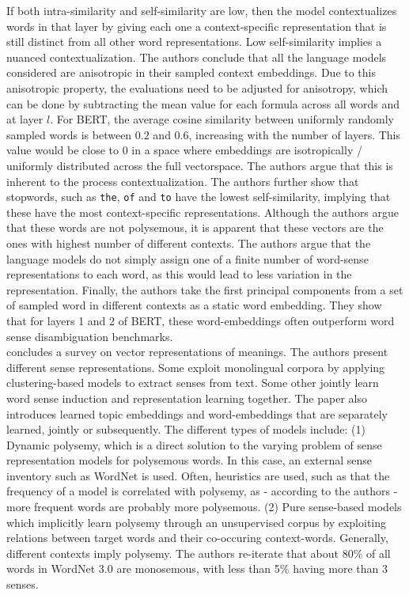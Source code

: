 \documentclass[a4paper,12pt,twoside,openright]{report}
\begin{document}
\quad

If both intra-similarity and self-similarity are low, then the model contextualizes words in that layer by giving each one a context-specific representation that is still distinct from all other word representations.
Low self-similarity implies a nuanced contextualization.
The authors conclude that all the language models considered are anisotropic in their sampled context embeddings.
Due to this anisotropic property, the evaluations need to be adjusted for anisotropy, which can be done by subtracting the mean value for each formula across all words and at layer $l$. 
For BERT, the average cosine similarity between uniformly randomly sampled words is between $0.2$ and $0.6$, increasing with the number of layers.
This value would be close to 0 in a space where embeddings are isotropically / uniformly distributed across the full vectorspace.
The authors argue that this is inherent to the process contextualization.
The authors further show that stopwords, such as \texttt{the}, \texttt{of} and \texttt{to} have the lowest self-similarity, implying that these have the most context-specific representations.
Although the authors argue that these words are not polysemous, it is apparent that these vectors are the ones with highest number of different contexts.
The authors argue that the language models do not simply assign one of a finite number of word-sense representations to each word, as this would lead to less variation in the representation.
Finally, the authors take the first principal components from a set of sampled word in different contexts as a static word embedding. 
They show that for layers 1 and 2 of BERT, these word-embeddings often outperform word sense disambiguation benchmarks.
\\

\cite{camachocollados18} concludes a survey on vector representations of meanings.
The authors present different sense representations.
Some exploit monolingual corpora by applying clustering-based models to extract senses from text.
Some other jointly learn word sense induction and representation learning together.
The paper also introduces learned topic embeddings and word-embeddings that are separately learned, jointly or subsequently.
The different types of models include: 
(1) Dynamic polysemy, which is a direct solution to the varying  problem of sense representation models for polysemous words.
In this case, an external sense inventory such as WordNet is used. 
Often, heuristics are used, such as that the frequency of a model is correlated with polysemy, as - according to the authors - more frequent words are probably more polysemous.
(2) Pure sense-based models which implicitly learn polysemy through an unsupervised corpus by exploiting relations between target words and their co-occuring context-words.
Generally, different contexts imply polysemy.
The authors re-iterate that about 80\% of all words in WordNet  3.0 are monosemous, with less than 5\% having more than 3 senses. \\
\end{document}
